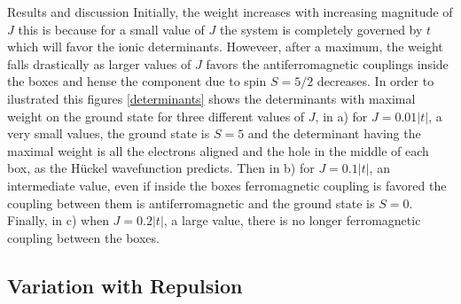 \documentclass[12pt,twoside]{report}
\begin{document}
\begin{chapter}{Results and discussion}
	 Initially, the weight increases with increasing magnitude of $J$ this is
	 because for a small value of $J$ the system is completely governed by $t$
	 which will favor the ionic determinants. Howeveer, after a maximum, the
	 weight falls drastically as larger values of $J$ favors the
	 antiferromagnetic couplings inside the boxes and hense the component due to spin $S=5 \slash 2$ decreases. In order to ilustrated this figures \ref{determinants} shows the determinants with maximal weight on the ground state for three different values of $J$, in a) for $J=0.01|t|$, a very small values, the ground state is $S=5$ and the determinant having the maximal weight is all the electrons aligned and the hole in the middle of each box, as the Hückel wavefunction predicts. Then in b) for $J=0.1|t|$, an intermediate value, even if inside the boxes ferromagnetic coupling is favored the coupling between them is antiferromagnetic and the ground state is $S=0$. Finally, in c) when $J=0.2|t|$, a large value, there is no longer ferromagnetic coupling between the boxes.	
	
	\subsection{Variation with Repulsion}


\end{chapter}
\end{document}
